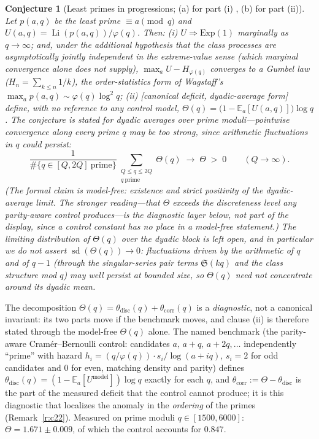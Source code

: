 \documentclass[11pt]{article}
\newtheorem{conjecture}{Conjecture}
\theoremstyle{definition}
\newcommand{\Li}{\operatorname{Li}}
\newcommand{\SG}{\mathfrak S}
\begin{document}
\setcounter{conjecture}{2}%
\begin{conjecture}[Least primes in progressions; (a) for part (i)
\cite{HLS,Wagstaff,Fiori,Leung}, (b) for part (ii)]\label{c22}
Let $p(a,q)$ be the least prime $\equiv a\pmod q$ and
$U(a,q)=\Li(p(a,q))/\varphi(q)$.  Then:
\emph{(i)} $U\Rightarrow\mathrm{Exp}(1)$ marginally as $q\to\infty$;
and, under the additional hypothesis that the class processes are
asymptotically jointly independent in the extreme-value sense (which
marginal convergence alone does not supply),
$\max_a U-H_{\varphi(q)}$ converges to a Gumbel law
($H_n=\sum_{k\le n}1/k$), the order-statistics form of Wagstaff's
$\max_a p(a,q)\sim\varphi(q)\log^2q$;
\emph{(ii)} [canonical deficit, dyadic-average form] define, with no
reference to any control model,
$\Theta(q)=\bigl(1-\mathbb E_a[U(a,q)]\bigr)\log q$.  The conjecture
is stated for dyadic averages over prime moduli---pointwise
convergence along every prime $q$ may be too strong, since
arithmetic fluctuations in $q$ could persist:
\[
\frac1{\#\{q\in[Q,2Q]\ \text{prime}\}}
\sum_{\substack{Q\le q\le2Q\\ q\ \mathrm{prime}}}\Theta(q)
\;\longrightarrow\;\Theta\;>\;0
\qquad(Q\to\infty).
\]
(The formal claim is model-free: existence and strict
positivity of the dyadic-average limit.  The stronger reading---that
$\Theta$ exceeds the discreteness level any parity-aware control
produces---is the diagnostic layer below, not part of the display,
since a control constant has no place in a model-free statement.)
The limiting \emph{distribution} of $\Theta(q)$ over the dyadic
block is left open, and in particular we do \emph{not} assert
$\operatorname{sd}(\Theta(q))\to0$: fluctuations driven by the
arithmetic of $q$ and of $q-1$ (through the singular-series pair
terms $\SG(kq)$ and the class structure mod $q$) may well persist at
bounded size, so $\Theta(q)$ need not concentrate around its
dyadic mean.
\end{conjecture}

The decomposition
$\Theta(q)=\theta_{\mathrm{disc}}(q)+\theta_{\mathrm{corr}}(q)$ is a
\emph{diagnostic}, not a canonical invariant: its two parts move if
the benchmark moves, and clause (ii) is therefore stated through the
model-free $\Theta(q)$ alone.  The named benchmark (the parity-aware
Cram\'er--Bernoulli
control: candidates $a,\,a+q,\,a+2q,\dots$ independently ``prime''
with hazard $h_i=(q/\varphi(q))\cdot s_i/\log(a+iq)$, $s_i=2$ for odd
candidates and $0$ for even, matching density and parity) defines
$\theta_{\mathrm{disc}}(q)=(1-\mathbb E_a[U^{\mathrm{model}}])\log q$
exactly for each $q$, and
$\theta_{\mathrm{corr}}:=\Theta-\theta_{\mathrm{disc}}$ is the part
of the measured deficit that the control cannot produce; it is this
diagnostic that localizes the anomaly in the \emph{ordering} of the
primes (Remark~\ref{r:c22}).  Measured on prime moduli
$q\in[1500,6000]$: $\Theta=1.671\pm0.009$, of which the control
accounts for $0.847$.
\end{document}
